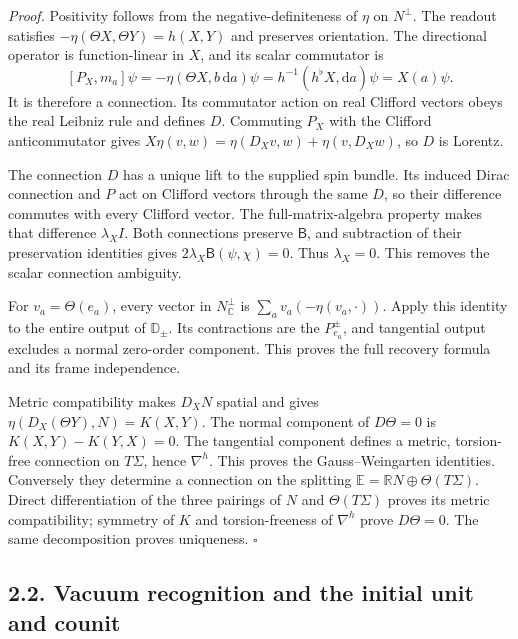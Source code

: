 \documentclass[
  english,
  11pt,
  reqno]{amsart}
\begin{document}
\emph{Proof.} Positivity follows from the negative-definiteness of
\(\eta\) on \(N^\perp\). The readout satisfies
\(-\eta(\Theta X,\Theta Y)=h(X,Y)\) and preserves orientation. The
directional operator is function-linear in \(X\), and its scalar
commutator is \[
[P_X,m_a]\psi
=-\eta(\Theta X,b\,\mathrm da)\psi
=h^{-1}(h^\flat X,\mathrm da)\psi
=X(a)\psi.
\] It is therefore a connection. Its commutator action on real Clifford
vectors obeys the real Leibniz rule and defines \(D\). Commuting \(P_X\)
with the Clifford anticommutator gives
\(X\eta(v,w)=\eta(D_Xv,w)+\eta(v,D_Xw)\), so \(D\) is Lorentz.

The connection \(D\) has a unique lift to the supplied spin bundle. Its
induced Dirac connection and \(P\) act on Clifford vectors through the
same \(D\), so their difference commutes with every Clifford vector. The
full-matrix-algebra property makes that difference \(\lambda_X I\). Both
connections preserve \(\mathsf B\), and subtraction of their
preservation identities gives \(2\lambda_X\mathsf B(\psi,\chi)=0\). Thus
\(\lambda_X=0\). This removes the scalar connection ambiguity.

For \(v_a=\Theta(e_a)\), every vector in \(N^\perp_{\mathbb C}\) is
\(\sum_a v_a(-\eta(v_a,\cdot))\). Apply this identity to the entire
output of \(\mathbb D_\pm\). Its contractions are the \(P_{e_a}^\pm\),
and tangential output excludes a normal zero-order component. This
proves the full recovery formula and its frame independence.

Metric compatibility makes \(D_XN\) spatial and gives
\(\eta(D_X(\Theta Y),N)=K(X,Y)\). The normal component of \(D\Theta=0\)
is \(K(X,Y)-K(Y,X)=0\). The tangential component defines a metric,
torsion-free connection on \(T\Sigma\), hence \(\nabla^h\). This proves
the Gauss--Weingarten identities. Conversely they determine a connection
on the splitting \(\mathbb E=\mathbb RN\oplus\Theta(T\Sigma)\). Direct
differentiation of the three pairings of \(N\) and \(\Theta(T\Sigma)\)
proves its metric compatibility; symmetry of \(K\) and torsion-freeness
of \(\nabla^h\) prove \(D\Theta=0\). The same decomposition proves
uniqueness. \hfill\(\square\)

\subsection{2.2. Vacuum recognition and the initial unit and
counit}\label{vacuum-recognition-and-the-initial-unit-and-counit}\label{sec:online-intrinsic-vacuum-recognition}
\end{document}
